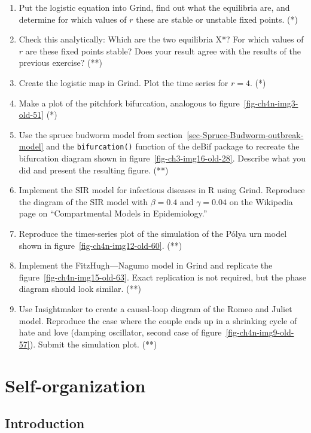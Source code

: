 \documentclass[
  a4paper,
  DIV=11,
  numbers=noendperiod,
  oneside]{scrreprt}
\begin{document}
\begin{enumerate}
\def\labelenumi{\arabic{enumi})}
\item
  Put the logistic equation into Grind, find out what the equilibria
  are, and determine for which values of \(r\) these are stable or
  unstable fixed points. (*)
\item
  Check this analytically: Which are the two equilibria X*? For which
  values of \(r\) are these fixed points stable? Does your result agree
  with the results of the previous exercise? (**)
\item
  Create the logistic map in Grind. Plot the time series for \(r = 4\).
  (*)
\item
  Make a plot of the pitchfork bifurcation, analogous to
  figure~\ref{fig-ch4n-img3-old-51} (*)
\item
  Use the spruce budworm model from
  section~\ref{sec-Spruce-Budworm-outbreak-model} and the
  \texttt{bifurcation()} function of the deBif package to recreate the
  bifurcation diagram shown in figure~\ref{fig-ch3-img16-old-28}.
  Describe what you did and present the resulting figure. (**)
\item
  Implement the SIR model for infectious diseases in R using Grind.
  Reproduce the diagram of the SIR model with \(\beta = 0.4\) and
  \(\gamma = 0.04\) on the Wikipedia page on ``Compartmental Models in
  Epidemiology.''
\item
  Reproduce the times-series plot of the simulation of the Pólya urn
  model shown in figure~\ref{fig-ch4n-img12-old-60}. (**)
\item
  Implement the FitzHugh---Nagumo model in Grind and replicate the
  figure~\ref{fig-ch4n-img15-old-63}. Exact replication is not required,
  but the phase diagram should look similar. (**)
\item
  Use Insightmaker to create a causal-loop diagram of the Romeo and
  Juliet model. Reproduce the case where the couple ends up in a
  shrinking cycle of hate and love (damping oscillator, second case of
  figure~\ref{fig-ch4n-img9-old-57}). Submit the simulation plot. (**)
\end{enumerate}


\chapter{Self-organization}\label{sec-ch5n}

\section{Introduction}\label{sec-Introduction-ch5n}
\end{document}
